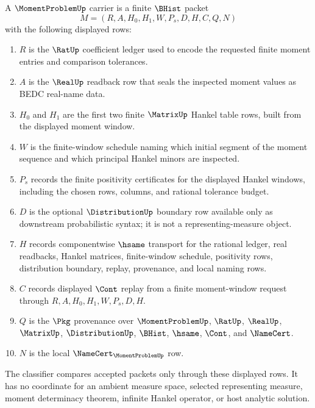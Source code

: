 \begin{definition}
\label{def:moment-problem-carrier}
A $\MomentProblemUp$ carrier is a finite $\BHist$ packet
$$
M=(R,A,H_0,H_1,W,P_s,D,H,C,Q,N)
$$
with the following displayed rows:
\begin{enumerate}
\item $R$ is the $\RatUp$ coefficient ledger used to encode the requested finite moment entries and comparison tolerances.
\item $A$ is the $\RealUp$ readback row that seals the inspected moment values as BEDC real-name data.
\item $H_0$ and $H_1$ are the first two finite $\MatrixUp$ Hankel table rows, built from the displayed moment window.
\item $W$ is the finite-window schedule naming which initial segment of the moment sequence and which principal Hankel minors are inspected.
\item $P_s$ records the finite positivity certificates for the displayed Hankel windows, including the chosen rows, columns, and rational tolerance budget.
\item $D$ is the optional $\DistributionUp$ boundary row available only as downstream probabilistic syntax; it is not a representing-measure object.
\item $H$ records componentwise $\hsame$ transport for the rational ledger, real readbacks, Hankel matrices, finite-window schedule, positivity rows, distribution boundary, replay, provenance, and local naming rows.
\item $C$ records displayed $\Cont$ replay from a finite moment-window request through $R,A,H_0,H_1,W,P_s,D,H$.
\item $Q$ is the $\Pkg$ provenance over $\MomentProblemUp$, $\RatUp$, $\RealUp$, $\MatrixUp$, $\DistributionUp$, $\BHist$, $\hsame$, $\Cont$, and $\NameCert$.
\item $N$ is the local $\NameCert_{\MomentProblemUp}$ row.
\end{enumerate}
The classifier compares accepted packets only through these displayed rows. It has no coordinate for an ambient measure space, selected representing measure, moment determinacy theorem, infinite Hankel operator, or host analytic solution.
\end{definition}

